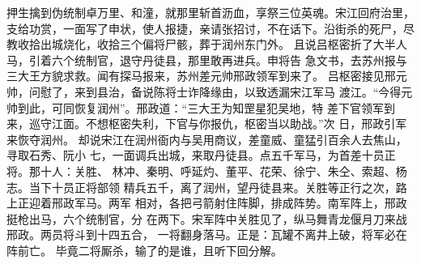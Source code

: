 押生擒到伪统制卓万里、和潼，就那里斩首沥血，享祭三位英魂。宋江回府治里，
支给功赏，一面写了申状，使人报捷，亲请张招讨，不在话下。沿街杀的死尸，尽
教收拾出城烧化，收拾三个偏将尸骸，葬于润州东门外。
且说吕枢密折了大半人马，引着六个统制官，退守丹徒县，那里敢再进兵。申将告
急文书，去苏州报与三大王方貌求救。闻有探马报来，苏州差元帅邢政领军到来了。
吕枢密接见邢元帅，问慰了，来到县治，备说陈将士诈降缘由，以致透漏宋江军马
渡江。“今得元帅到此，可同恢复润州”。邢政道：“三大王为知罡星犯吴地，特
差下官领军到来，巡守江面。不想枢密失利，下官与你报仇，枢密当以助战。”次
日，邢政引军来恢夺润州。
却说宋江在润州衙内与吴用商议，差童威、童猛引百余人去焦山，寻取石秀、阮小
七，一面调兵出城，来取丹徒县。点五千军马，为首差十员正将。那十人：关胜、
林冲、秦明、呼延灼、董平、花荣、徐宁、朱仝、索超、杨志。当下十员正将部领
精兵五千，离了润州，望丹徒县来。关胜等正行之次，路上正迎着邢政军马。两军
相对，各把弓箭射住阵脚，排成阵势。南军阵上，邢政挺枪出马，六个统制官，分
在两下。宋军阵中关胜见了，纵马舞青龙偃月刀来战邢政。两员将斗到十四五合，
一将翻身落马。正是：瓦罐不离井上破，将军必在阵前亡。
毕竟二将厮杀，输了的是谁，且听下回分解。